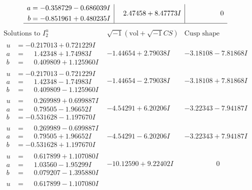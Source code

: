 \documentclass[1p]{elsarticle_modified}
\theoremstyle{definition}
\newcommand{\I}{\sqrt{-1}}
\begin{document}
$$\begin{array}{c|c|c}
\begin{aligned}
a &= -0.358729 - 0.686039 I \\
b &= -0.851961 + 0.480235 I\end{aligned}
 & \phantom{-}2.47458 + 8.47773 I & \phantom{-0.000000 } 0\\
 \hline 
 \end{array}$$\newpage$$\begin{array}{c|c|c}  
\text{Solutions to }I^u_{2}& \I (\text{vol} + \sqrt{-1}CS) & \text{Cusp shape}\\
 \hline 
\begin{aligned}
u &= -0.217013 + 0.721229 I \\
a &= \phantom{-}1.42348 + 1.74983 I \\
b &= \phantom{-}0.409809 + 1.125960 I\end{aligned}
 & -1.44654 + 2.79038 I & -3.18108 - 7.81868 I \\ \hline\begin{aligned}
u &= -0.217013 - 0.721229 I \\
a &= \phantom{-}1.42348 - 1.74983 I \\
b &= \phantom{-}0.409809 - 1.125960 I\end{aligned}
 & -1.44654 - 2.79038 I & -3.18108 + 7.81868 I \\ \hline\begin{aligned}
u &= \phantom{-}0.269989 + 0.699887 I \\
a &= \phantom{-}0.79505 - 1.96652 I \\
b &= -0.531628 - 1.197670 I\end{aligned}
 & -4.54291 + 6.20206 I & -3.22343 - 7.94187 I \\ \hline\begin{aligned}
u &= \phantom{-}0.269989 - 0.699887 I \\
a &= \phantom{-}0.79505 + 1.96652 I \\
b &= -0.531628 + 1.197670 I\end{aligned}
 & -4.54291 - 6.20206 I & -3.22343 + 7.94187 I \\ \hline\begin{aligned}
u &= \phantom{-}0.617899 + 1.107080 I \\
a &= \phantom{-}1.03560 - 1.95299 I \\
b &= \phantom{-}0.079207 - 1.395880 I\end{aligned}
 & -10.12590 + 9.22402 I & \phantom{-0.000000 } 0 \\ \hline\begin{aligned}
u &= \phantom{-}0.617899 - 1.107080 I \\

\end{aligned}
\end{array}$$
\end{document}
